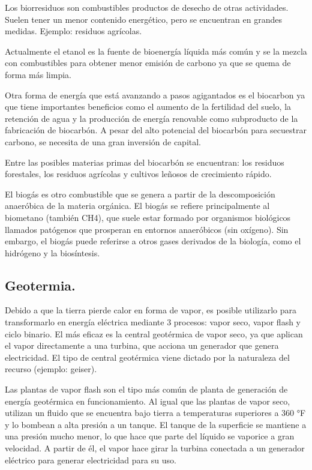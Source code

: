 \documentclass[runningheads]{llncs}
\begin{document}
Los biorresiduos son combustibles productos de desecho de otras actividades. Suelen tener un menor contenido energético, pero se encuentran en grandes medidas. Ejemplo: residuos agrícolas.

Actualmente el etanol es la fuente de bioenergía  líquida más común y se la mezcla con combustibles para obtener menor emisión de carbono ya que se quema de forma más limpia.

Otra forma de energía que está avanzando a pasos agigantados es el biocarbon ya que tiene importantes beneficios como el aumento de la fertilidad del suelo, la retención de agua y la producción de energía renovable como subproducto de la fabricación de biocarbón. A pesar del alto potencial del biocarbón para secuestrar carbono, se necesita de una gran inversión de capital. 

Entre las posibles materias primas del biocarbón se encuentran: los residuos forestales, los residuos agrícolas y cultivos leñosos de crecimiento rápido.

El biogás es otro combustible que se genera a partir de la descomposición anaeróbica de la materia orgánica. El biogás se refiere principalmente al biometano (también CH4), que suele estar formado por organismos biológicos llamados patógenos que prosperan en entornos anaeróbicos (sin oxígeno). Sin embargo, el biogás puede referirse a otros gases derivados de la biología, como el hidrógeno y la biosíntesis.

\subsection{Geotermia.
}

Debido a que la tierra pierde calor en forma de vapor, es posible utilizarlo para transformarlo en energía eléctrica mediante 3 procesos: vapor seco, vapor flash y ciclo binario. El más eficaz es la central geotérmica de vapor seco, ya que aplican el vapor directamente a una turbina, que acciona un generador que genera electricidad. El tipo de central geotérmica viene dictado por la naturaleza del recurso (ejemplo: geiser).

Las plantas de vapor flash son el tipo más común de planta de generación de energía geotérmica en funcionamiento. Al igual que las plantas de vapor seco, utilizan un fluido que se encuentra bajo tierra a temperaturas superiores a 360 °F y lo bombean a alta presión a un tanque. El tanque de la superficie se mantiene a una presión mucho menor, lo que hace que parte del líquido se vaporice a gran velocidad. A partir de él, el vapor hace girar la turbina conectada a un generador eléctrico para generar electricidad para su uso. 
\end{document}
